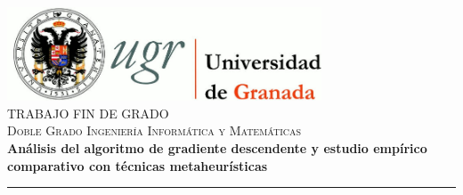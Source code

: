 \begin{titlepage}
 
 
\newlength{\centeroffset}
\setlength{\centeroffset}{-0.5\oddsidemargin}
\addtolength{\centeroffset}{0.5\evensidemargin}
\thispagestyle{empty}

\noindent\hspace*{\centeroffset}\begin{minipage}{\textwidth}

\centering
\includegraphics[width=0.7\textwidth]{Plantilla_TFG_latex/imagenes/logo_ugr.jpg}\\[1.4cm]

\textsc{ \Large TRABAJO FIN DE GRADO\\[0.2cm]}
\textsc{ Doble Grado Ingeniería Informática y Matemáticas}\\[1cm]
% 
{\huge\bfseries Análisis del algoritmo de gradiente descendente y estudio empírico comparativo con técnicas metaheurísticas\\
}
\noindent\rule[-1ex]{\textwidth}{3pt}\\[3.5ex]

\end{minipage}

\vspace{1cm}
\noindent\hspace*{\centeroffset}\begin{minipage}{\textwidth}
\centering


\end{minipage}
\end{titlepage}
